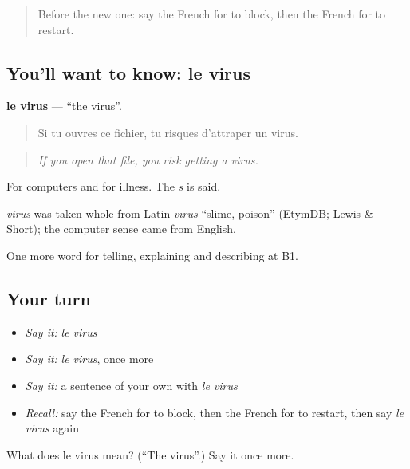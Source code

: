 \label{lesson:FR-C399-virus}



\begin{quote}
Before the new one: say the French for to block, then the French for to restart.
\end{quote}

\subsection*{You'll want to know: le virus}
\textbf{le virus} — \textquotedblleft{}the virus\textquotedblright{}.

\begin{quote}
Si tu ouvres ce fichier, tu risques d'attraper un virus.
\end{quote}

\begin{quote}
\emph{If you open that file, you risk getting a virus.}
\end{quote}

For computers and for illness. The \emph{s} is said.

\begin{cousinweb}
\emph{virus} was taken whole from Latin \emph{vīrus} \textquotedblleft{}slime, poison\textquotedblright{} (EtymDB; Lewis \& Short); the computer sense came from English.
\end{cousinweb}

\begin{grammarlens}[title={What you've built}]
One more word for telling, explaining and describing at B1.
\end{grammarlens}

\subsection*{Your turn}
\begin{itemize}
\raggedright
  \item \emph{Say it:} \emph{le virus}
  \item \emph{Say it:} \emph{le virus}, once more
  \item \emph{Say it:} a sentence of your own with \emph{le virus}
  \item \emph{Recall:} say the French for to block, then the French for to restart, then say \emph{le virus} again
\end{itemize}

\begin{tcolorbox}[breakable,colback=teal!4,colframe=teal!35!black,title={Before you move on}]
What does le virus mean? (\textquotedblleft{}The virus\textquotedblright{}.) Say it once more.
\end{tcolorbox}
